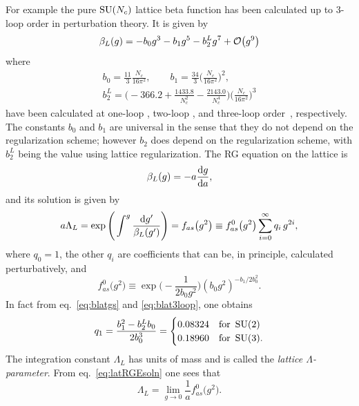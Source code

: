 For example the pure $\operatorname{SU}(N_c)$ lattice beta function has been calculated 
up to 3-loop order in perturbation theory. It is given by
\begin{equation}\label{eq:blatgs}
  \beta_L(g)=-b_0g^3-b_1g^5-b_2^Lg^7+\order{g^{9}}
\end{equation}
where
\begin{equation}\label{eq:blat3loop}\begin{gathered}
  b_{0}= \frac{11}{3}\frac{N_c}{16\pi^2}, \qquad
  b_{1}= \frac{34}{3}\Bigg(\frac{N_c}{16\pi^2}\Bigg)^{2},\\
  b_{2}^{L}=\Bigg(-366.2+\frac{1433.8}{N_c^2}-\frac{2143.0}{N_c^4}\Bigg)
            \Bigg(\frac{N_c}{16\pi^2}\Bigg)^{3}
\end{gathered}\end{equation}
have been calculated at one-loop 
\cite{gross_d.j._ultraviolet_1973,politzer_reliable_1973}, two-loop 
\cite{belavin_calculation_1974,caswell_asymptotic_1974,jones_two-loop_1974},
and three-loop order~\cite{alle_three-loop_1997}, respectively.
The constants $b_0$ and $b_1$ are universal in the sense that they do not 
depend on the regularization scheme; however $b_2$ does depend on the
regularization scheme, with $b_2^L$ being the value using lattice
regularization. The RG equation on the lattice is
\begin{equation}
  \beta_{L}(g)=-a\dv{g}{a},
\end{equation}
and its solution is given by
\begin{equation}\label{eq:latRGEsoln}
  a\Lambda_{L}
   =\exp\Bigg(\int^g\frac{\dd g'}{\beta_{L}(g')}\Bigg) \\
   =f_{as}\big(g^2\big)
   \equiv f_{as}^0\big(g^2\big)\sum\limits_{i=0}^{\infty}
     q_i\,g^{2i},
\end{equation}
where $q_0=1$, the other $q_i$ are coefficients that can be, in 
principle, calculated perturbatively, and
\begin{equation}\label{eq:f0}
   f_{as}^0\big(g^2\big)\equiv\exp\Bigg(-\frac{1}{2b_{0}g^2}\Bigg)
    (b_{0}g^{2})^{-b_{1}/2b_{0}^{2}}.
\end{equation}
In fact from eq.~\eqref{eq:blatgs} and \eqref{eq:blat3loop}, one obtains
\begin{equation}\label{eq:q1value}
  q_1=\frac{b_{1}^{2}-b_{2}^{L}b_{0}}{2b_{0}^{3}}=
  \begin{cases}
     0.08324 & \text{for}\ \operatorname{SU}(2) \\
     0.18960 & \text{for}\ \operatorname{SU}(3).
  \end{cases}
\end{equation}
The integration constant $\Lambda_{L}$ has units of mass and is called the
{\it lattice $\Lambda$-parameter}.
From eq.~\eqref{eq:latRGEsoln} one sees that
\begin{equation}\label{eq:llat}
  \Lambda_L=\lim_{g\to0}\frac{1}{a}f_{as}^0\big(g^2\big).
\end{equation}

